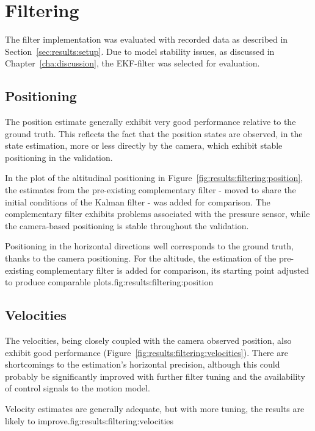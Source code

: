 \section{Filtering}
\label{sec:results:filtering}
The filter implementation was evaluated with recorded data as described in Section~\ref{sec:results:setup}.
Due to model stability issues, as discussed in Chapter~\ref{cha:discussion},
the EKF-filter was selected for evaluation.

\subsection{Positioning}
    The position estimate generally exhibit very good performance relative
    to the ground truth.
    This reflects the fact that the position states are observed,
    in the state estimation, more or less directly by the camera,
    which exhibit stable positioning in the validation.

    In the plot of the altitudinal positioning in Figure~\ref{fig:results:filtering:position},
    the estimates from the pre-existing complementary filter -
    moved to share the initial conditions of the Kalman filter - was added for
    comparison. The complementary filter exhibits problems associated
    with the pressure sensor, while the camera-based positioning is stable
    throughout the validation.

    \begin{subfigures}{Positioning in the horizontal directions well
    corresponds to the ground truth, thanks to the camera positioning.
    For the altitude, the estimation of the pre-existing complementary filter is added for comparison, its starting point adjusted to produce comparable plots.}{fig:results:filtering:position}
    \end{subfigures}

\subsection{Velocities}
    The velocities, being closely coupled with the camera observed position,
    also exhibit good performance (Figure~\ref{fig:results:filtering:velocities}).
    There are shortcomings to the estimation's horizontal precision, although
    this could probably be significantly improved with further filter tuning
    and the availability of control signals to the motion model.
    \begin{subfigures}{Velocity estimates are generally adequate, but with more tuning, the results are likely to improve.}{fig:results:filtering:velocities}
    \end{subfigures}

